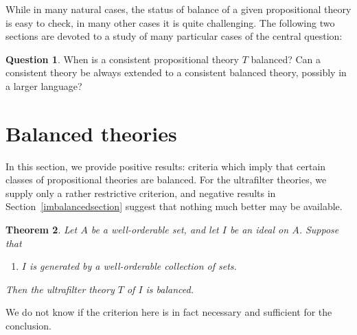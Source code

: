 \documentclass{article}
\newtheorem{theorem}{Theorem}[section]
\theoremstyle{definition}
\newtheorem{question}[theorem]{Question}
\begin{document}
\noindent While in many natural cases, the status of balance of a given propositional theory is easy to check, in many other cases it is quite challenging. The following two sections are devoted to a study of many particular cases of the central question:

\begin{question}
	When is a consistent propositional theory $T$ balanced? Can a consistent theory be always extended to a consistent balanced theory, possibly in a larger language?
\end{question}

\section{Balanced theories}
\label{balancedsection}

In this section, we provide positive results: criteria which imply that certain classes of propositional theories are balanced. For the ultrafilter theories, we supply only a rather restrictive criterion, and negative results in Section~\ref{imbalancedsection} suggest that nothing much better may be available.

\begin{theorem}
\label{welltheorem}
Let $A$ be a well-orderable set, and let $I$ be an ideal on $A$. Suppose that

\begin{enumerate}
\item[(*)] $I$ is generated by a well-orderable collection of sets.
\end{enumerate}

\noindent Then the ultrafilter theory $T$ of $I$ is balanced.
\end{theorem}

\noindent We do not know if the criterion here is in fact necessary and sufficient for the conclusion.
\end{document}
